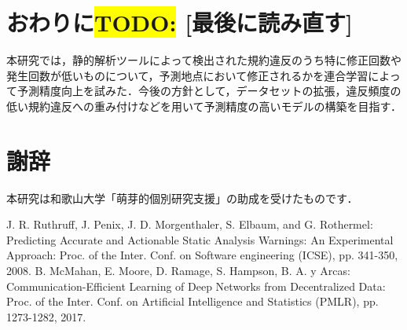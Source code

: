 \documentclass[uplatex,dvipdfmx,a4paper,twocolumn,base=11pt,jbase=11pt,ja=standard]{bxjsarticle}  %
\newcommand{\todo}[1]{\colorbox{yellow}{{\bf TODO}:}{\color{red} {\textbf{[#1]}}}}
\begin{document}




\section{おわりに\todo{最後に読み直す}}

本研究では，静的解析ツールによって検出された規約違反のうち特に修正回数や発生回数が低いものについて，予測地点において修正されるかを連合学習によって予測精度向上を試みた．今後の方針として，データセットの拡張，違反頻度の低い規約違反への重み付けなどを用いて予測精度の高いモデルの構築を目指す．






\section*{謝辞}
本研究は和歌山大学「萌芽的個別研究支援」の助成を受けたものです．


\begin{thebibliography}{1}
     J. R. Ruthruff, J. Penix, J. D. Morgenthaler, S. Elbaum, and G. Rothermel: Predicting Accurate and Actionable Static Analysis Warnings: An Experimental Approach: Proc. of the Inter. Conf. on Software engineering (ICSE), pp. 341-350, 2008.
     B. McMahan, E. Moore, D. Ramage, S. Hampson, B. A. y Arcas: Communication-Efficient Learning of Deep Networks from Decentralized Data: Proc. of the Inter. Conf. on Artificial Intelligence and Statistics (PMLR), pp. 1273-1282, 2017.
\end{thebibliography}





%
\end{document}
